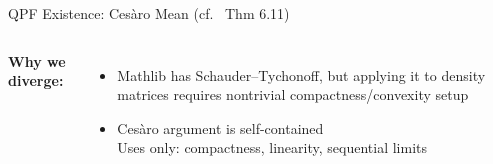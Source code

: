 \documentclass[aspectratio=169,10pt]{beamer}
\begin{document}
\begin{frame}{QPF Existence: Ces\`aro Mean \textnormal{(cf.\ \cite{Wolf2012Quantum} Thm 6.11)}}
\begin{columns}[T]
        \vspace{0.3em}
        \textbf{\textcolor{amber}{Why we diverge:}}
        \begin{itemize}\itemsep0.1em\small
            \item Mathlib has Schauder--Tychonoff, but
                applying it to density matrices requires nontrivial
                compactness/convexity setup
            \item Ces\`aro argument is self-contained\\
                {\tiny Uses only: compactness, linearity, sequential limits}
        \end{itemize}
    \end{columns}
\end{frame}

\end{document}
